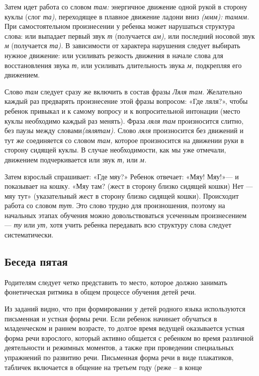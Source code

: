 \documentclass[a5paper]{book}
\renewcommand{\emph}[1]{\textit{#1}}
\begin{document}
Затем идет работа со словом \emph{там:} энергичное движение одной рукой
в сторону куклы (слог \emph{та)}, переходящее в плавное движение ладони
вниз \emph{(ммм): таммм.} При самостоятельном произнесении у ребенка
может нарушаться структура слова: или выпадает первый звук \emph{т}
(получается \emph{ам),} или последний носовой звук \emph{м} (получается
\emph{та).} В зависимости от характера нарушения следует выбирать нужное
движение: или усиливать резкость движения в начале слова для
восстановления звука \emph{т,} или усиливать длительность звука
\emph{м,} подкрепляя его движением.

Слово \emph{там} следует сразу же включить в состав фразы \emph{Ляля
там.} Желательно каждый раз предварять произнесение этой фразы вопросом:
«Где ляля?», чтобы ребенок привыкал и к самому вопросу и к
вопросительной интонации (место куклы необходимо каждый раз менять).
Фраза \emph{ляля там} произносится слитно, без паузы между
словами\emph{(лялятам).} Слово \emph{ляля} произносится без движений и
тут же соединяется со словом \emph{там,} которое произносится на
движении руки в сторону сидящей куклы. В случае необходимости, как мы
уже отмечали, движением подчеркивается или звук \emph{т,} или \emph{м.}

Затем взрослый спрашивает: «Где мяу?» Ребенок отвечает: «Мяу! Мяу!»--- и
показывает на кошку. «Мяу там? (жест в сторону близко сидящей кошки) Нет
--- мяу тут» (указательный жест в сторону близко сидящей кошки).
Происходит работа со словом \emph{тут.} Это слово трудно для
произношения, поэтому на начальных этапах обучения можно
довольствоваться усеченным произнесением --- \emph{ту} или \emph{ут,}
хотя учить ребенка передавать всю структуру слова следует
систематически.

\subsection*{Беседа пятая}

Родителям следует четко представить то место, которое должно занимать
фонетическая ритмика в общем процессе обучения детей речи.

Из заданий видно, что при формировании у детей родного языка
используются письменная и устная формы речи. Если ребенок начинает
обучаться в младенческом и раннем возрасте, то долгое время ведущей
оказывается устная форма речи взрослого, который активно общается с
ребенком во время различной деятельности и режимных моментов, а также
при проведении специальных упражнений по развитию речи. Письменная форма
речи в виде плакатиков, табличек включается в общение на третьем году
(реже -- в конце
\end{document}
